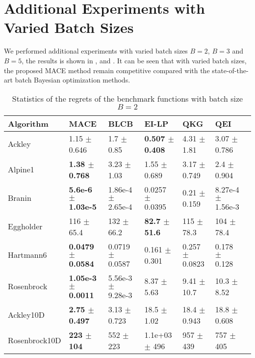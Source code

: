 \section{Additional Experiments with Varied Batch Sizes}

We performed additional experiments with varied batch sizes $B = 2$, $B = 3$
and $B = 5$, the results is shown in ,
 and . It can be
seen that with varied batch sizes, the proposed MACE method remain competitive
compared with the state-of-the-art batch Bayesian optimization methods. 

\begin{table*}[!htb]
    \centering
    \caption{Statistics of the regrets of the benchmark functions with batch size $B=2$}
    \label{tab:result_analytical_b2}
    \begin{tabular}{lllllll}
        \toprule
        Algorithm     & MACE                                   & BLCB                       & EI-LP                        & QKG                    & QEI                              \\ 
        \midrule
        Ackley        & 1.15             $\pm$  0.646    &  1.7       $\pm$  0.85      &  \textbf{0.507  $\pm$ 0.408}   &  4.31   $\pm$  1.81    &  3.07      $\pm$  0.786    \\
        Alpine1       & \textbf{1.38     $\pm$  0.768}   &  3.23      $\pm$  1.03      &  1.55           $\pm$ 0.689    &  3.17   $\pm$  0.749   &  2.4       $\pm$  0.904    \\
        Branin        & \textbf{5.6e-6   $\pm$  1.03e-5} &  1.86e-4   $\pm$  2.65e-4   &  0.0257         $\pm$ 0.0395   &  0.21   $\pm$  0.159   &  8.27e-4   $\pm$  1.56e-3  \\
        Eggholder     & 116              $\pm$  65.4     &  132       $\pm$  66.2      &  \textbf{82.7   $\pm$ 51.6}    &  115    $\pm$  78.3    &  104       $\pm$  78.4     \\
        Hartmann6     & \textbf{0.0479   $\pm$  0.0584}  &  0.0719    $\pm$  0.0587    &  0.161          $\pm$ 0.301    &  0.257  $\pm$  0.0823  &  0.178     $\pm$  0.128    \\
        Rosenbrock    & \textbf{1.05e-3  $\pm$  0.0011}  &  5.56e-3   $\pm$  9.28e-3   &  8.37           $\pm$ 5.63     &  9.41   $\pm$  10.7    &  10.3      $\pm$  8.52     \\
        Ackley10D     & \textbf{2.75     $\pm$  0.497}   &  3.13      $\pm$  0.723     &  18.5           $\pm$ 1.02     &  18.4   $\pm$  0.943   &  18.8      $\pm$  0.608    \\
        Rosenbrock10D & \textbf{223      $\pm$  104}     &  552       $\pm$  223       &  1.1e+03        $\pm$ 496      &  957    $\pm$  439     &  757       $\pm$  405      \\
        \bottomrule
    \end{tabular}
\end{table*}

